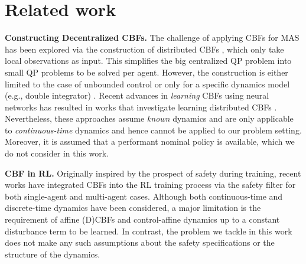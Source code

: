\section{Related work}
\noindent\textbf{Constructing Decentralized CBFs. }
The challenge of applying CBFs for MAS has been explored via the construction of distributed CBFs \citep{borrmann2015control,glotfelter2017nonsmooth,wang2017safety,lindemann2019control,black2023adaptation}, which only take local observations as input.
This simplifies the big centralized QP problem into small QP problems to be solved per agent.
However, the construction is either limited to the case of unbounded control \citep{lindemann2019control}
or only for a specific dynamics model (e.g., double integrator) \citep{borrmann2015control,glotfelter2017nonsmooth,wang2017safety}.
Recent advances in \textit{learning} CBFs using neural networks \citep{saveriano2019learning,srinivasan2020synthesis,lindemann2021learning,peruffo2021automated,dawson2022safe,so2024train,knoedler2024rpcbf} has resulted in works that investigate learning distributed CBFs \citep{qin2021learning,zhang2023neural,zhang2024gcbf+,zinage2024decentralized}.
Nevertheless, these approaches assume \textit{known} dynamics and are only applicable to \textit{continuous-time} dynamics and hence cannot be applied to our problem setting. Moreover, it is assumed that a performant nominal policy is available, which we do not consider in this work.

\noindent\textbf{CBF in RL. }
Originally inspired by the prospect of safety during training, recent works have integrated CBFs into the RL training process via the safety filter \citep{tearle2021predictive,hsu2023safety,garg2024learning} for both single-agent \citep{cheng2019end,emam2022safe,hailemichael2023optimal} and multi-agent \citep{pereira2021safe,pereira2022decentralized} cases.
Although both continuous-time \citep{emam2022safe,hailemichael2023optimal} and discrete-time \citep{cheng2019end} dynamics have been considered,
a major limitation is the requirement of affine (D)CBFs and control-affine dynamics up to a constant disturbance term to be learned.
In contrast, the problem we tackle in this work does not make any such assumptions about the safety specifications or the structure of the dynamics. 

